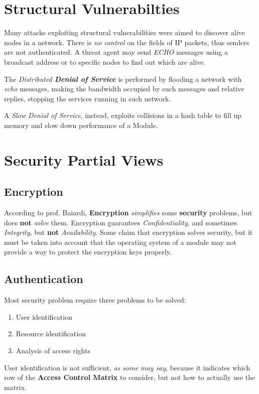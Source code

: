 

\section{Structural Vulnerabilties}
Many attacks exploiting structural vulnerabilities were aimed to discover alive nodes in a network.
There is \textit{no control} on the fields of IP packets, thus senders are not authenticated.
A threat agent may send \textit{ECHO} messages using a broadcast address or to specific nodes to find out which are alive.

The \textit{Distributed \textbf{Denial of Service}} is performed by flooding a network with \textit{echo} messages,
making the bandwidth occupied by such messages and relative replies,
stopping the services running in such network.

A \textit{Slow Denial of Service}, instead, exploits collisions in a hash table to fill up memory and slow down performance of a Module.

\section{Security Partial Views}
\subsection{Encryption}
According to prof. Baiardi, \textbf{Encryption} \textit{simplifies} some \textbf{security} problems, but does \textbf{not} \textit{solve} them.
Encryption guarantees \textit{Confidentiality}, and sometimes \textit{Integrity}, but \textbf{not} \textit{Availability}.
Some claim that encryption solves security, but it must be taken into account that the operating system of a module may not provide a way to protect the encryption keys properly.

\subsection{Authentication}
Most security problem require three problems to be solved:
\begin{enumerate}
    \item User identification
    \item Resource identification
    \item Analysis of access rights
\end{enumerate}
User identification is not sufficient, \textit{as some may say}, because it indicates which row of the \textbf{Access Control Matrix} to consider, but not how to actually use the matrix.

